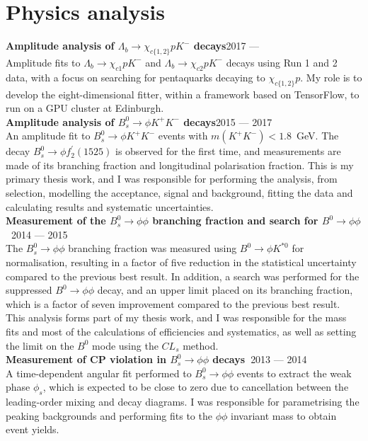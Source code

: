 \documentclass[contbibnum,titleabove]{simplecv}
\newcommand\dateditem[2]{#1\hfill#2\\}
\newcommand\topictitle[3]{\dateditem{{\textbf{#1}}}{#3}#2}
\begin{document}
	\section{Physics analysis}
	\topictitle{Amplitude analysis of $\Lambda_b \to \chi_{c\{1,2\}} p K^{-}$ decays}{}{2017 ---}
	Amplitude fits to $\Lambda_b \to \chi_{c1} p K^{-}$ and $\Lambda_b \to \chi_{c2} p K^{-}$ decays using Run 1 and 2 data, with a focus on searching for pentaquarks decaying to $\chi_{c\{1,2\}} p$.
	My role is to develop the eight-dimensional fitter, within a framework based on TensorFlow, to run on a GPU cluster at Edinburgh.
	\\
	\topictitle{Amplitude analysis of $B^0_s \to \phi K^{+}K^{-}$ decays}{}{2015 --- 2017}
	An amplitude fit to ${B^0_s \to \phi K^{+}K^{-}}$ events with ${m(K^{+}K^{-})<1.8}$~GeV. The decay ${B^0_s \to \phi f_2^\prime(1525)}$ is observed for the first time, and measurements are made of its branching fraction and longitudinal polarisation fraction.
	This is my primary thesis work, and I was responsible for performing the analysis, from selection, modelling the acceptance, signal and background, fitting the data and calculating results and systematic uncertainties.
	\\
	\topictitle{Measurement of the $B^0_s \to \phi\phi$ branching fraction and search for $B^0 \to \phi \phi$~\textnormal{\cite{phiphiBF}}}{}{2014 --- 2015}
	The $B^0_s \to \phi\phi$ branching fraction was measured using $B^0 \to \phi K^{*0}$ for normalisation, resulting in a factor of five reduction in the statistical uncertainty compared to the previous best result.
	In addition, a search was performed for the suppressed $B^0 \to \phi\phi$ decay, and an upper limit placed on its branching fraction, which is a factor of seven improvement compared to the previous best result.
	This analysis forms part of my thesis work, and I was responsible for the mass fits and most of the calculations of efficiencies and systematics, as well as setting the limit on the $B^0$ mode using the $CL_s$ method.
	\\
	\topictitle{Measurement of CP violation in $B^0_s \to \phi\phi$ decays~\textnormal{\cite{phiphiCPV}}}{}{2013 --- 2014}
	A time-dependent angular fit performed to $B^0_s \to \phi\phi$ events to extract the weak phase $\phi_s$, which is expected to be close to zero due to cancellation between the leading-order mixing and decay diagrams.
	I was responsible for parametrising the peaking backgrounds and performing fits to the $\phi\phi$ invariant mass to obtain event yields.
\newpage
\end{document}
